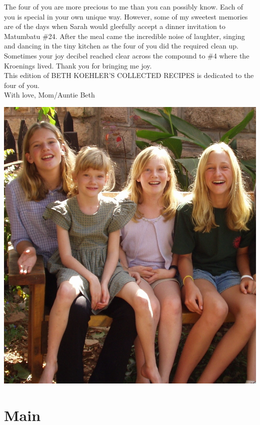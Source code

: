 \documentclass[12pt]{memoir} %
\begin{document}
The four of you are more precious to me than you can possibly know. Each of you is special in your own unique way. However, some of my sweetest memories are of the days when Sarah would gleefully accept a dinner invitation to Matumbatu \#24. After the meal came the incredible noise of laughter, singing and dancing in the tiny kitchen as the four of you did the required clean up. Sometimes your joy decibel reached clear across the compound to \#4 where the Kroenings lived. Thank you for bringing me joy. \\[10pt]

This edition of BETH KOEHLER'S COLLECTED RECIPES is dedicated to the four of you. \\[10pt]

\hspace{0.5\linewidth}With love, Mom/Auntie Beth

\centerline{\includegraphics[width=0.75\linewidth]{Girls.jpg}}


\part{Main}






\end{document}
